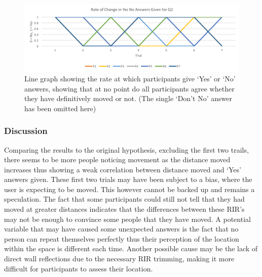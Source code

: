 \documentclass[../../main.tex]{subfiles}
\begin{document}
				\begin{figure}[H]
					\centerline{\includegraphics[scale = 0.7]{Sections/userTesting/images/test2/rateofchange.png}}
					\caption{Line graph showing the rate at which participants give `Yes' or `No' answers, showing that at no point do all participants agree whether they have definitively moved or not. (The single `Don't No' answer has been omitted here)}
					\label{test2rate}
				\end{figure}

			\subsubsection{Discussion}

				Comparing the results to the original hypothesis, excluding the first two trails, there seems to be more people noticing movement as the distance moved increases thus showing a weak correlation between distance moved and `Yes' answers given. These first two trials may have been subject to a bias, where the user is expecting to be moved. This however cannot be backed up and remains a speculation. The fact that some participants could still not tell that they had moved at greater distances indicates that the differences between these \ac{RIR}'s may not be enough to convince some people that they have moved. A potential variable that may have caused some unexpected answers is the fact that no person can repeat themselves perfectly thus their perception of the location within the space is different each time. Another possible cause may be the lack of direct wall reflections due to the necessary \ac{RIR} trimming, making it more difficult for participants to assess their location.


\end{document}

